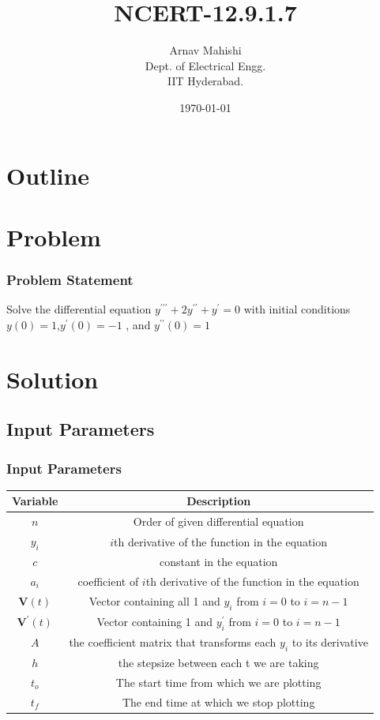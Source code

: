 \documentclass{beamer}
\title{NCERT-12.9.1.7}
\author{Arnav Mahishi \\ Dept. of Electrical Engg.\\IIT Hyderabad.}
\date{\today}
\providecommand{\brak}[1]{\ensuremath{\left(#1\right)}}
\theoremstyle{remark}
\let\vec\mathbf
\numberwithin{equation}{section}
\begin{document}
\begin{frame}
\titlepage
\end{frame}
\section*{Outline}
\begin{frame}
\tableofcontents
\end{frame}
\section{Problem}
\begin{frame}
\frametitle{Problem Statement}
Solve the differential equation $y^{\prime\prime\prime}+2y^{\prime\prime}+y^{\prime} = 0$ with initial conditions $y\brak{0} = 1$,$y^{\prime}\brak{0} = -1$ , and $y^{\prime\prime}\brak{0} = 1$
\end{frame}
\section{Solution}
\subsection{Input Parameters}
\begin{frame}
\frametitle{Input Parameters}
\begin{table}[]
    \centering
    \begin{tabular}[12pt]{ |c| c|}
    \hline
    \textbf{Variable} & \textbf{Description}\\ 
    \hline
    $n$ & Order of given differential equation\\
    \hline
    $y_i$ & $i$th derivative of the function in the equation\\
    \hline
    $c$ & constant in the equation\\
    \hline
    $a_i$&coefficient of $i$th derivative of the function in the equation\\
    \hline
    $\vec{V}\brak{t}$& Vector containing all 1 and $y_i$ from $i=0$ to $i=n-1$\\
    \hline
    $\vec{V}^{\prime}\brak{t}$ & Vector containing 1 and $y^{\prime}_i$ from $i=0$ to $i=n-1$\\
    \hline
    $A$& the coefficient matrix that transforms each $y_i$ to its derivative\\
    \hline
    $h$&the stepsize between each t we are taking\\
    \hline
    $t_o$& The start time from which we are plotting\\
    \hline
    $t_f$& The end time at which we stop plotting\\
    \hline
    \end{tabular}
    \label{tab:my_label}
\end{table}
\end{frame}
\end{document}
